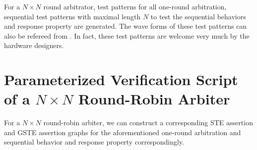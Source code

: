 \documentclass[final]{IEEEtran}
\begin{document}
For a $N \times N$ round arbitrator, test patterns for all one-round
arbitration,   sequential test patterns  with maximal length $N$ to
test the sequential behaviors and response property are generated.
The wave forms of these test patterns can also be refereed from
\cite{Li11ArbiterExperiments}. In fact, these test patterns are
welcome very much by the hardware designers.

\section{Parameterized Verification Script of a $N \times N $ Round-Robin Arbiter}
\label{sec:Verification} For a $N \times N$  round-robin arbiter, we
can construct a corresponding STE assertion and GSTE assertion
graphs for the aforementioned one-round arbitration and sequential
behavior and response property correspondingly.
\end{document}
